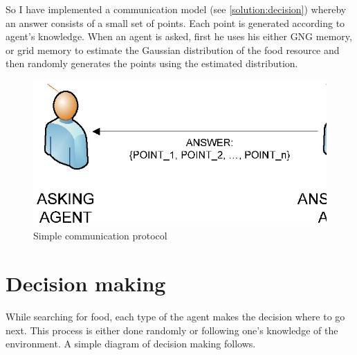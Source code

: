 So I have implemented a communication model (see \ref{solution:decision}) whereby an answer consists of a small set of points. Each point is generated according to agent's knowledge. When an agent is asked, first he uses his either GNG memory, or grid memory to estimate the Gaussian distribution of the food resource and then randomly generates the points using the estimated distribution.

\begin{figure}
  \centering                                
  \includegraphics[scale=0.7]{diagrams/solution/communication.eps}    
  \caption{Simple communication protocol}
  \label{solution:communication}
\end{figure}

\section{Decision making}

While searching for food, each type of the agent makes the decision where to go next. This process is either done randomly or following one's knowledge of the environment. A simple diagram of decision making follows.

